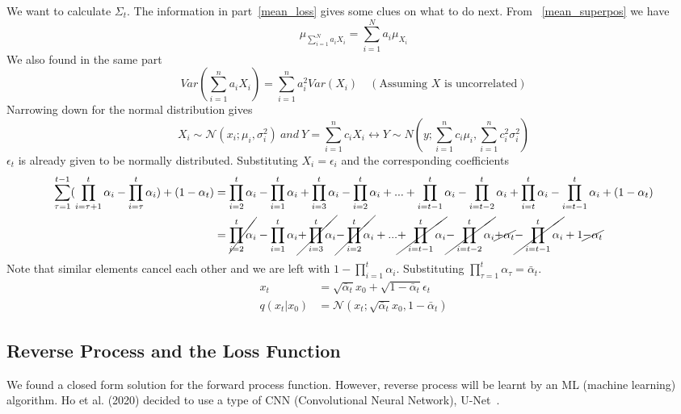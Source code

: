 \documentclass{book}
\numberwithin{equation}{subsection}
\begin{document}
We want to calculate $\Sigma_t$. The information in part~\ref{mean_loss} gives some clues on what to do next. From ~\ref{mean_superpos} we have
\begin{equation}
    \mu_{\sum_{i=1}^N a_i X_i} = \sum_{i=1}^N a_i \mu_{X_i}
\end{equation}
We also found in the same part
\begin{equation}
    Var(\sum_{i=1}^{n} a_i X_i) = \sum_{i=1}^{n} a_i^2 Var(X_i) \quad (\text{Assuming $X$ is uncorrelated})
    \label{varsum}
\end{equation}
Narrowing down for the normal distribution gives
\begin{equation}
    X_i \sim \mathcal{N}(x_i; \mu_i, \sigma_i^2)\ and\ Y = \sum_{i=1}^{n}c_iX_i \longleftrightarrow Y \sim N(y; \sum_{i=1}^{n}c_i\mu_i,\sum_{i=1}^{n}c_i^2\sigma_i^2)
\end{equation}
$\epsilon_t$ is already given to be normally distributed. Substituting $X_i = \epsilon_i$ and the corresponding coefficients
\begin{align}
    \sum_{\tau=1}^{t-1}(\prod_{i=\tau+1}^{t}\alpha_i-\prod_{i=\tau}^{t}\alpha_i)+(1-\alpha_t) &= \prod_{i=2}^{t}\alpha_i-\prod_{i=1}^{t}\alpha_i+\prod_{i=3}^{t}\alpha_i-\prod_{i=2}^{t}\alpha_i+...+\prod_{i=t-1}^{t}\alpha_i-\prod_{i=t-2}^{t}\alpha_i+\prod_{i=t}^{t}\alpha_i-\prod_{i=t-1}^{t}\alpha_i+(1-\alpha_t)\\
    &= \cancel{\prod_{i=2}^{t}\alpha_i}-\prod_{i=1}^{t}\alpha_i\cancel{+\prod_{i=3}^{t}\alpha_i}\cancel{-\prod_{i=2}^{t}\alpha_i}+...\cancel{+\prod_{i=t-1}^{t}\alpha_i}\cancel{-\prod_{i=t-2}^{t}\alpha_i}\cancel{+\alpha_t}\cancel{-\prod_{i=t-1}^{t}\alpha_i}+1\cancel{-\alpha_t}
\end{align}
Note that similar elements cancel each other and we are left with $1-\prod_{i=1}^{t}\alpha_i$. Substituting $\prod_{\tau=1}^{t}\alpha_\tau = \bar{\alpha}_t$.
\begin{align}
    x_t &= \sqrt{\bar{\alpha}_t}x_0 + \sqrt{1 - \bar{\alpha}_t}\epsilon_t\label{reparam_xt}\\
    q(x_t|x_0) &= \mathcal{N}(x_t;\sqrt{\bar{\alpha}_t}x_0,1 - \bar{\alpha}_t)
\end{align}
\subsection{Reverse Process and the Loss Function}
We found a closed form solution for the forward process function. However, reverse process will be learnt by an ML (machine learning) algorithm. Ho et al. (2020) decided to use a type of CNN (Convolutional Neural Network), U-Net~\cite{ho_denoising_2020}.
\end{document}
